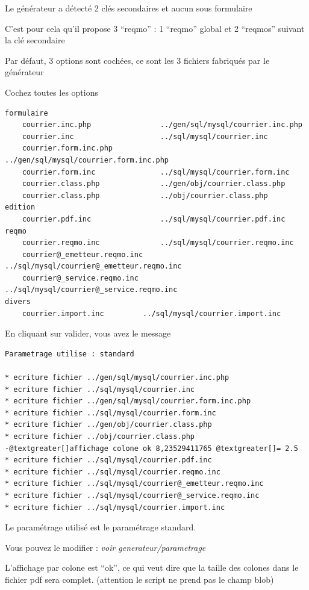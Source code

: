 \documentclass[letterpaper,10pt,french]{manual}
\begin{document}
Le générateur a détecté 2 clés secondaires et aucun sous formulaire

C'est pour cela qu'il propose 3 ``reqmo'' : 1 ``reqmo'' global et 2 ``reqmos'' suivant la clé secondaire

Par défaut, 3 options sont cochées, ce sont les 3 fichiers fabriqués par le générateur

Cochez toutes les options

\begin{Verbatim}[commandchars=@\[\]]
formulaire
    courrier.inc.php                ../gen/sql/mysql/courrier.inc.php
    courrier.inc                    ../sql/mysql/courrier.inc
    courrier.form.inc.php           ../gen/sql/mysql/courrier.form.inc.php
    courrier.form.inc               ../sql/mysql/courrier.form.inc
    courrier.class.php              ../gen/obj/courrier.class.php
    courrier.class.php              ../obj/courrier.class.php
edition
    courrier.pdf.inc                ../sql/mysql/courrier.pdf.inc
reqmo
    courrier.reqmo.inc              ../sql/mysql/courrier.reqmo.inc
    courrier@_emetteur.reqmo.inc ../sql/mysql/courrier@_emetteur.reqmo.inc
    courrier@_service.reqmo.inc      ../sql/mysql/courrier@_service.reqmo.inc
divers
    courrier.import.inc         ../sql/mysql/courrier.import.inc
\end{Verbatim}

En cliquant sur valider, vous avez le message

\begin{Verbatim}[commandchars=@\[\]]
Parametrage utilise : standard

* ecriture fichier ../gen/sql/mysql/courrier.inc.php
* ecriture fichier ../sql/mysql/courrier.inc
* ecriture fichier ../gen/sql/mysql/courrier.form.inc.php
* ecriture fichier ../sql/mysql/courrier.form.inc
* ecriture fichier ../gen/obj/courrier.class.php
* ecriture fichier ../obj/courrier.class.php
-@textgreater[]affichage colone ok 8,23529411765 @textgreater[]= 2.5
* ecriture fichier ../sql/mysql/courrier.pdf.inc
* ecriture fichier ../sql/mysql/courrier.reqmo.inc
* ecriture fichier ../sql/mysql/courrier@_emetteur.reqmo.inc
* ecriture fichier ../sql/mysql/courrier@_service.reqmo.inc
* ecriture fichier ../sql/mysql/courrier.import.inc
\end{Verbatim}

Le paramétrage utilisé est le paramétrage standard.

Vous pouvez le modifier : \emph{voir generateur/parametrage}

L'affichage par colone est ``ok'', ce qui veut dire que la taille des colones
dans le fichier pdf sera complet. (attention le script ne prend pas le champ blob)
\end{document}
